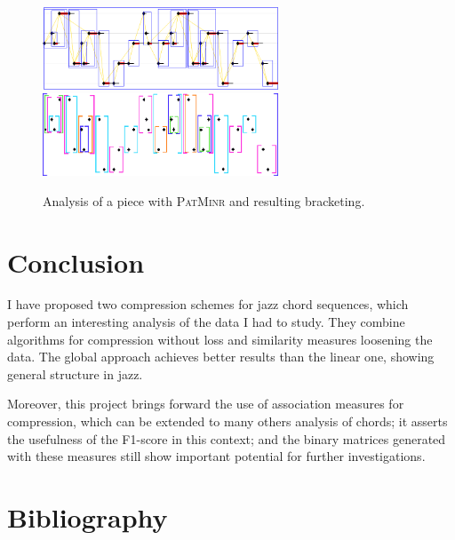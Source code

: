 \documentclass[a4paper,10pt]{article}
\renewcommand{\baselinestretch}{1.5}
\begin{document}
\begin{figure}[h]
\centering
\includegraphics[width=7cm]{images/patminr1.jpg}\hspace{1cm}
\includegraphics[width=7cm]{images/patminr2.jpg}
\caption{Analysis of a piece with \textsc{PatMinr} and resulting bracketing.\label{bracket}}
\end{figure}


\section{Conclusion}

I have proposed two compression schemes for jazz chord sequences, which perform an interesting analysis of the data I had to study. They combine algorithms for compression without loss and similarity measures loosening the data. The global approach achieves better results than the linear one, showing general structure in jazz.

Moreover, this project brings forward the use of association measures for compression, which can be extended to many others analysis of chords; it asserts the usefulness of the F1-score in this context; and the binary matrices generated with these measures still show important potential for further investigations.

\newpage
\section{Bibliography}



\end{document}
